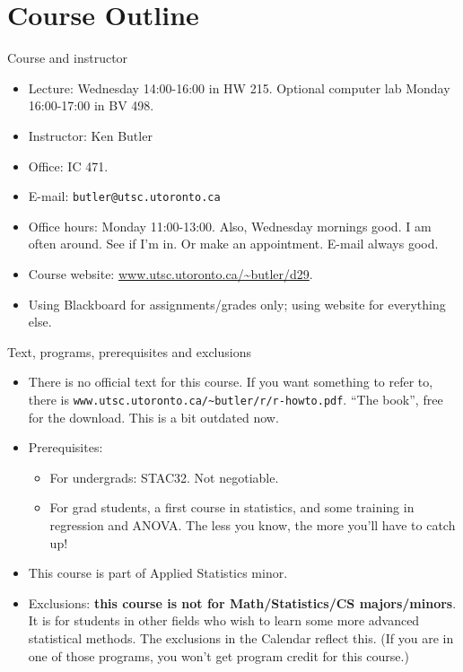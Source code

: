 \section*{Course Outline}
\frame{\sectionpage}

\begin{frame}[fragile]{Course and instructor}
  \begin{itemize}
    \item  Lecture: Wednesday 14:00-16:00 in HW 215. Optional computer
      lab Monday 16:00-17:00 in BV 498.
    \item  Instructor: Ken Butler
    \item  Office: IC 471.
    \item  E-mail: \verb-butler@utsc.utoronto.ca-
    \item Office hours: Monday 11:00-13:00. Also, Wednesday mornings
      good. I am often around. See if I'm in. Or make an
      appointment. E-mail always good.
    \item Course website: 
\url{www.utsc.utoronto.ca/~butler/d29}.
    \item Using Blackboard for assignments/grades only; using website for
      everything else.
\end{itemize}

\end{frame}

\begin{frame}[fragile]{Text, programs, prerequisites and exclusions}

\begin{itemize}
\item There is no official text for this course. If you want something
  to refer to, there is
      \verb=www.utsc.utoronto.ca/~butler/r/r-howto.pdf=. 
      ``The book'', free for the download. This is a bit outdated now.
    \item Prerequisites:
      \begin{itemize}
      \item For undergrads: STAC32. Not negotiable.
    \item  For grad students,
      a first course in statistics, and some training in
      regression and ANOVA. The less you know, the more you'll have to
      catch up!
      \end{itemize}

    \item This course is part of Applied Statistics minor.
    \item Exclusions: \textbf{this course is not for Math/Statistics/CS majors/minors}. It
      is for
      students in other fields who wish to learn some more advanced
      statistical methods. The exclusions in the Calendar reflect
      this. (If you are in one of those programs, you won't get
      program credit for this course.)
\end{itemize}
  
\end{frame}


